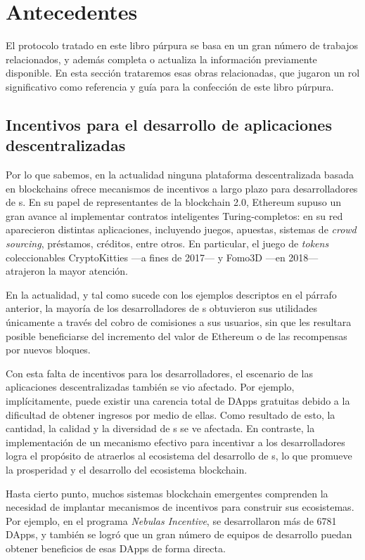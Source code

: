 \section{Antecedentes}
\label{sec:antecedentes}
\noindent
El protocolo tratado en este libro púrpura se basa en un gran número de trabajos relacionados, y además completa o actualiza la información previamente disponible. En esta sección trataremos esas obras relacionadas, que jugaron un rol significativo como referencia y guía para la confección de este libro púrpura.

\subsection{Incentivos para el desarrollo de aplicaciones descentralizadas}
\noindent
Por lo que sabemos, en la actualidad ninguna plataforma descentralizada basada en blockchains ofrece
mecanismos de incentivos a largo plazo para desarrolladores de {\dapp}s. En su papel de representantes de la blockchain 2.0, Ethereum supuso un gran avance al implementar contratos inteligentes Turing-completos: en su red aparecieron distintas aplicaciones,
incluyendo juegos, apuestas, sistemas de \textit{crowd sourcing}, préstamos, créditos, entre otros. En particular, el juego de \textit{tokens} coleccionables CryptoKitties —a fines de 2017— y Fomo3D —en 2018— atrajeron la mayor atención.

En la actualidad, y tal como sucede con los ejemplos descriptos en el párrafo anterior, la mayoría de los desarrolladores de {\dapp}s obtuvieron sus utilidades únicamente a través del cobro de comisiones a sus usuarios, sin que les resultara posible beneficiarse del incremento del valor de Ethereum o de las recompensas por nuevos bloques.

Con esta falta de incentivos para los desarrolladores, el escenario de las aplicaciones descentralizadas también se vio afectado. Por ejemplo, implícitamente, puede existir una carencia total de DApps gratuitas debido a la dificultad de obtener ingresos por medio de ellas. Como resultado de esto, la cantidad, la calidad y la diversidad de {\dapp}s se ve afectada. En contraste, la implementación de un mecanismo efectivo para incentivar a los desarrolladores logra el propósito de atraerlos al ecosistema del desarrollo de {\dapp}s, lo que promueve la prosperidad y el desarrollo del ecosistema blockchain.

Hasta cierto punto, muchos sistemas blockchain emergentes comprenden la necesidad de implantar mecanismos de incentivos para construir sus ecosistemas. Por ejemplo, en el programa \textit{Nebulas Incentive}, se desarrollaron más de 6781 DApps, y también se logró que un gran número de equipos de desarrollo puedan obtener beneficios de esas DApps de forma directa.


